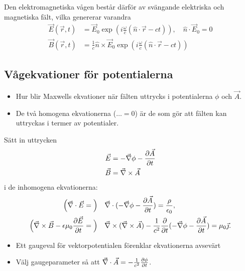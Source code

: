 \documentclass[%
oneside,                 %
final,                   %
10pt]{article}
\begin{document}
\noindent
Den elektromagnetiska vågen består därför av svängande elektriska och magnetiska fält, vilka genererar varandra
\begin{align}
\vec{E}(\vec{r},t) &= \vec{E}_0 \exp\left( i \frac{\omega}{c}(\hat{n} \cdot \vec{r} - c t ) \right), \quad \hat{n} \cdot \vec{E}_0 = 0  \\
\vec{B}(\vec{r},t) &= \frac{1}{c} \hat{n} \times \vec{E}_0 \exp\left( i \frac{\omega}{c}(\hat{n} \cdot \vec{r} - c t ) \right)  
\end{align}

\subsection*{Vågekvationer för potentialerna}

\begin{itemize}
\item Hur blir Maxwells ekvationer när fälten uttrycks i potentialerna $\phi$ och $\vec A$.

\item De två homogena ekvationerna ($\ldots = 0$) är de som gör att fälten kan uttryckas i termer av potentialer. 
\end{itemize}

\noindent
Sätt in uttrycken
\begin{align}
\vec{E} &= -\vec{\nabla} \phi - \frac{\partial \vec{A}}{\partial t} \nonumber \\
\vec{B} &= \vec{\nabla} \times \vec{A} \nonumber
\end{align}
i de inhomogena ekvationerna:
\begin{align*}
\Big( \vec{\nabla} \cdot \vec{E} &= \Big) \quad \vec{\nabla}\cdot(-\vec{\nabla}\phi-\frac{\partial \vec A}{\partial t}) = \frac{\rho}{\epsilon_0}, \\
\Big( \vec{\nabla} \times \vec{B} - \epsilon \mu_0 \frac{\partial \vec{E}}{\partial t}
&= \Big) \quad \vec{\nabla}\times(\vec{\nabla}\times\vec A) - \frac{1}{c^2} \frac{\partial}{\partial t} (-\vec{\nabla}\phi-\frac{\partial \vec A}{\partial t})=\mu_0\vec\jmath .
\end{align*}
\begin{itemize}
\item Ett gaugeval för vektorpotentialen förenklar ekvationerna avsevärt 

\item Välj gaugeparameter så att $\vec{\nabla}\cdot\vec A = - \frac{1}{c^2} \frac{\partial \phi}{\partial t}$. 
\end{itemize}
\end{document}
